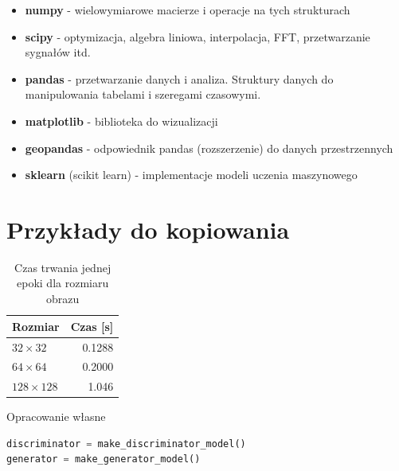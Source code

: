 \documentclass[wi]{zut}
\begin{document}
\begin{itemize}
    \item \textbf{numpy} - wielowymiarowe macierze i operacje na tych strukturach
    \item \textbf{scipy} - optymizacja, algebra liniowa, interpolacja, FFT, przetwarzanie sygnałów itd.
    \item \textbf{pandas} - przetwarzanie danych i analiza. Struktury danych do manipulowania tabelami i szeregami czasowymi.
    \item \textbf{matplotlib} - biblioteka do wizualizacji
    \item \textbf{geopandas} - odpowiednik pandas (rozszerzenie) do danych przestrzennych
    \item \textbf{sklearn} (scikit learn) - implementacje modeli uczenia maszynowego
\end{itemize}



\printbibliography[heading=bibintoc]

\appendix

\section{Przykłady do kopiowania}

\begin{table}[H]
\caption{Czas trwania jednej epoki dla rozmiaru obrazu}
\vspace{1em}
\centering
\begin{tabular}{@{}lr@{}}
\toprule
Rozmiar          & Czas {[}s{]} \\ \midrule
$32 \times 32$   & 0.1288       \\
$64 \times 64$   & 0.2000       \\
$128 \times 128$ & 1.046        \\ \bottomrule
\end{tabular}
\end{table}

{Opracowanie własne}{\label{kod:przyklad}}
\begin{lstlisting}[language=Python]
discriminator = make_discriminator_model()
generator = make_generator_model()
\end{lstlisting}
\end{document}
